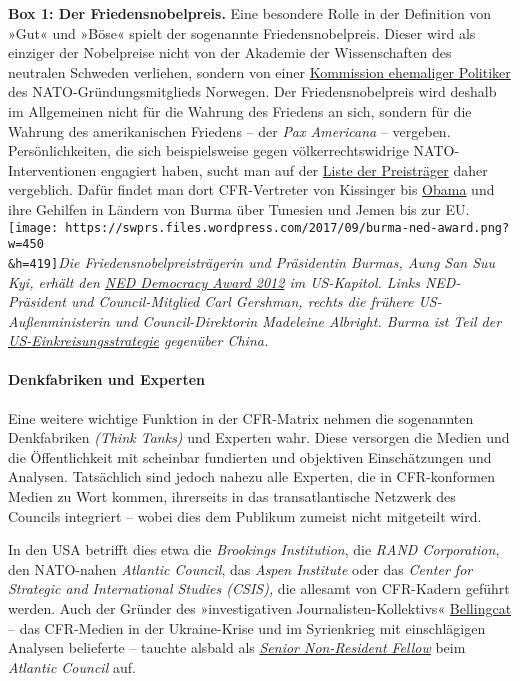 \textbf{Box 1: Der Friedensnobelpreis.} Eine besondere Rolle in der
Definition von »Gut« und »Böse« spielt der sogenannte
Friedens­nobel­preis. Dieser wird als einziger der Nobelpreise nicht von
der Akademie der Wissenschaften des neutralen Schweden verliehen,
sondern von einer
\href{https://de.wikipedia.org/wiki/Friedensnobelpreis}{Kommission
ehemaliger Politiker} des NATO-Gründungs­mitglieds Norwegen. Der
Friedens­nobel­preis wird deshalb im Allgemeinen nicht für die Wahrung
des Friedens an sich, sondern für die Wahrung des amerikanischen
Friedens -- der \emph{Pax Americana} -- vergeben. Persönlich­keiten, die
sich beispielsweise gegen völker­rechts­widrige NATO-Interventionen
engagiert haben, sucht man auf der
\href{https://de.wikipedia.org/wiki/Liste_der_Friedensnobelpreistr\%C3\%A4ger}{Liste
der Preisträger} daher vergeblich. Dafür findet man dort CFR-Vertreter
von Kissinger bis
\href{https://swprs.org/das-american-empire-und-seine-medien/\#wh}{Obama}
und ihre Gehilfen in Ländern von Burma über Tunesien und Jemen bis zur
EU.\\
\texttt{[image: https://swprs.files.wordpress.com/2017/09/burma-ned-award.png?w=450\\\&h=419]}\emph{Die
Friedensnobelpreisträgerin und Präsidentin Burmas, Aung San Suu Kyi,
erhält den
\href{http://www.prnewswire.com/news-releases/aung-san-suu-kyi-to-address-ned-2012-democracy-award-in-us-capitol-167734515.html}{NED
Democracy Award 2012} im US-Kapitol. Links NED-Präsident und
Council-Mitglied Carl Gershman, rechts die frühere US-Außenministerin
und Council-Direktorin Madeleine Albright. Burma ist Teil der
\href{https://journal-neo.org/2017/09/08/us-to-fight-us-saudi-sponsored-terrorism-in-asia/}{US-Einkreisungsstrategie}
gegenüber China.}

\hypertarget{denkfabriken-und-experten}{%
\paragraph{Denkfabriken und Experten}\label{denkfabriken-und-experten}}

Eine weitere wichtige Funktion in der CFR-Matrix nehmen die sogenannten
Denkfabriken \emph{(Think Tanks)} und Experten wahr. Diese versorgen die
Medien und die Öffentlichkeit mit scheinbar fundierten und objektiven
Einschätzungen und Analysen. Tatsächlich sind jedoch nahezu alle
Experten, die in CFR-konformen Medien zu Wort kommen, ihrerseits in das
transatlantische Netzwerk des Councils integriert -- wobei dies dem
Publikum zumeist nicht mitgeteilt wird.

In den USA betrifft dies etwa die \emph{Brookings Institution}, die
\emph{RAND Corporation}, den NATO-nahen \emph{Atlantic Council}, das
\emph{Aspen Institute} oder das \emph{Center for Strategic and
International Studies (CSIS),} die allesamt von CFR-Kadern geführt
werden. Auch der Gründer des »investigativen Journalisten-Kollektivs«
\href{https://en.wikipedia.org/wiki/Bellingcat}{Bellingcat} -- das
CFR-Medien in der Ukraine-Krise und im Syrienkrieg mit einschlägigen
Analysen belieferte -- tauchte alsbald als
\href{https://en.wikipedia.org/wiki/Eliot_Higgins}{\emph{Senior
Non-Resident Fellow}} beim \emph{Atlantic Council} auf.

